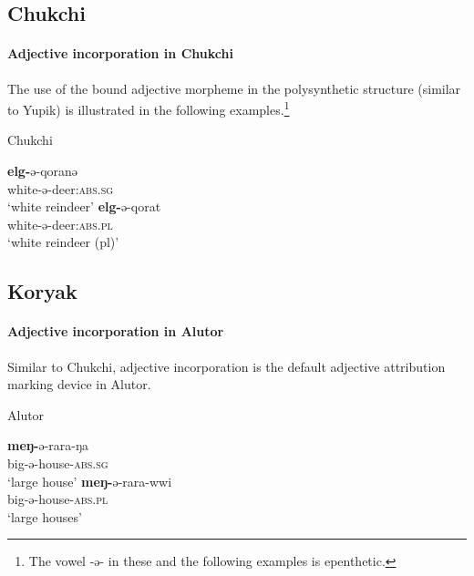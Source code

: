 \subsection{Chukchi}
\paragraph*{Adjective incorporation in Chukchi}
The use of the bound adjective morpheme in the polysynthetic structure (similar to Yupik) is illustrated in the following examples.\footnote{The vowel -ə- in these and the following examples is epenthetic.}
\begin{exe}
\ex \rm{Chukchi \citep{skorik1960}}
\begin{xlist}
\ex	
\gll	\textbf{elg-}ə-qoranə\\
	white-ə-deer:\textsc{abs.sg}\\
\glt	‘white reindeer’
\ex
\gll	\textbf{elg-}ə-qorat\\
	white-ə-deer:\textsc{abs.pl}\\
\glt	‘white reindeer (pl)’
\end{xlist}
\end{exe}

\subsection{Koryak}
\paragraph*{Adjective incorporation in Alutor}
Similar to Chukchi, adjective incorporation is the default adjective attribution marking device in Alutor.
\begin{exe}
\ex \rm{Alutor \citep{nagayama2003}}
\begin{xlist}
\ex
\gll	\textbf{meŋ-}ə-rara-ŋa\\
	big-ə-house-\textsc{abs.sg}\\
\glt	‘large house’
\ex
\gll	\textbf{meŋ-}ə-rara-wwi\\
	big-ə-house-\textsc{abs.pl}\\
\glt	‘large houses’
\end{xlist}
\end{exe}

